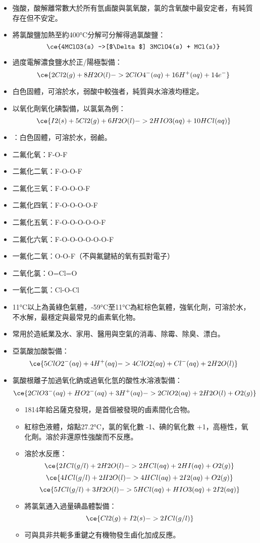 \documentclass[a4paper,12pt]{report}
\begin{document}
\begin{itemize}
\item 強酸，酸解離常數大於所有氫鹵酸與氯氧酸，氯的含氧酸中最安定者，有純質存在但不安定。
\item 將氯酸鹽加熱至約400°C分解可分解得過氯酸鹽：
\[\ce{4MClO3(s) ->[$\Delta$] 3MClO4(s) + MCl(s)}\]
\item 過度電解濃食鹽水於正/陽極製備：
\[\ce{2Cl2(g) + 8H2O(l) -> 2ClO4^-(aq) + 16H^+(aq) + 14e^-}\]
\eit
{}
\bit
\item 白色固體，可溶於水，弱酸中較強者，純質與水溶液均穩定。
\item 以氧化劑氧化碘製備，以氯氣為例：
\[\ce{I2(s) + 5Cl2(g) + 6H2O(l) -> 2HIO3(aq) + 10HCl(aq)}\]
\item {}：白色固體，可溶於水，弱鹼。
\eit
{}
\bit
\item 二氟化氧：F-O-F
\item 二氟化二氧：F-O-O-F
\item 二氟化三氧：F-O-O-O-F
\item 二氟化四氧：F-O-O-O-O-F
\item 二氟化五氧：F-O-O-O-O-O-F
\item 二氟化六氧：F-O-O-O-O-O-O-F
\item 一氟化二氧：O-O-F（不與氟鍵結的氧有孤對電子）
\item 二氧化氯：O=Cl=O
\item 一氧化二氯：Cl-O-Cl
\eit
{}
\bit
\item 11°C以上為黃綠色氣體，-59°C至11°C為紅棕色氣體，強氧化劑，可溶於水，不水解，最穩定與最常見的鹵素氧化物。
\item 常用於造紙業及水、家用、醫用與空氣的消毒、除霉、除臭、漂白。
\item 亞氯酸加酸製備：
\[\ce{5ClO2^-(aq) + 4H^+(aq) -> 4ClO2(aq) + Cl^-(aq) + 2H2O(l)}\]
\item 氯酸根離子加過氧化鈉或過氧化氫的酸性水溶液製備：
\[\ce{2ClO3^-(aq) + HO2^-(aq) + 3H^+(aq) -> 2ClO2(aq) + 2H2O(l) + O2(g)}\]
\eit
{}
\begin{itemize}
\item 1814年給呂薩克發現，是首個被發現的鹵素間化合物。
\item 紅棕色液體，熔點27.2°C，氯的氧化數 -1、碘的氧化數 +1，高極性，氧化劑。溶於非還原性強酸而不反應。
\item 溶於水反應：
\[\ce{2ICl(g/l) + 2H2O(l) -> 2HCl(aq) + 2HI(aq) + O2(g)}\]
\[\ce{4ICl(g/l) + 2H2O(l) -> 4HCl(aq) + 2I2(aq) + O2(g)}\]
\[\ce{5ICl(g/l) + 3H2O(l) -> 5HCl(aq) + HIO3(aq) + 2I2(aq)}\]
\item 將氯氣通入過量碘晶體製備：
\[\ce{Cl2(g) + I2(s) -> 2ICl(g/l)}\]
\item 可與具非共軛多重鍵之有機物發生鹵化加成反應。
\end{itemize}

\end{itemize}
\end{document}
